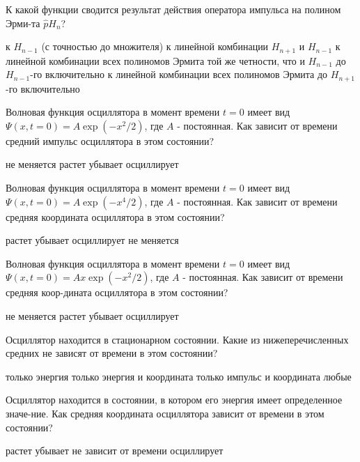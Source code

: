 \documentclass[11pt,a4paper]{exam}
\begin{document}
\begin{questions}
\question К какой функции сводится результат действия оператора импульса на полином Эрми-та $\hat{p}{{H}_{n}}$? 
\begin{choices}
\choice к ${{H}_{n-1}}$ (с точностью до множителя)
\choice к линейной комбинации ${{H}_{n+1}}$ и ${{H}_{n-1}}$
\choice к линейной комбинации всех полиномов Эрмита той же четности, что и ${{H}_{n-1}}$ до ${{H}_{n-1}}$-го включительно
\choice к линейной комбинации всех полиномов Эрмита до ${{H}_{n+1}}$-го включительно
\end{choices}

\question Волновая функция осциллятора в момент времени $t=0$ имеет вид $\Psi (x,t=0)=A\exp (-{{x}^{2}}/2)$, где $A$ - постоянная. Как зависит от времени средний импульс осциллятора в этом состоянии? 
\begin{choices}
\choice не меняется    
\choice растет   
\choice убывает  
\choice осциллирует
\end{choices}

\question Волновая функция осциллятора в момент времени $t=0$ имеет вид $\Psi (x,t=0)=A\exp (-{{x}^{4}}/2)$, где $A$ - постоянная. Как зависит от времени средняя координата осциллятора в этом состоянии? 
\begin{choices}
\choice растет      
\choice убывает     
\choice осциллирует 
\choice не меняется
\end{choices}

\question Волновая функция осциллятора в момент времени $t=0$ имеет вид $\Psi (x,t=0)=Ax\exp (-{{x}^{2}}/2)$, где $A$ - постоянная. Как зависит от времени средняя коор-дината осциллятора в этом состоянии? 
\begin{choices}
\choice не меняется    
\choice растет   
\choice убывает  
\choice осциллирует
\end{choices}

\question Осциллятор находится в стационарном состоянии. Какие из нижеперечисленных средних не зависят от времени в этом состоянии?
\begin{choices}
\choice только энергия             
\choice только энергия и координата
\choice только импульс и координата      
\choice любые
\end{choices}

\question Осциллятор находится в состоянии, в котором его энергия имеет определенное значе-ние. Как средняя координата осциллятора зависит от времени в этом состоянии?
\begin{choices}
\choice растет      
\choice убывает     
\choice не зависит от времени      
\choice осциллирует
\end{choices}


\end{questions}
\end{document}
